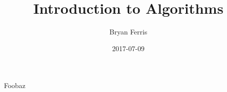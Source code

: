 \documentclass{article}
\title{Introduction to Algorithms}
\date{2017-07-09}
\author{Bryan Ferris}
\begin{document}
\maketitle
Foobaz
\end{document}
